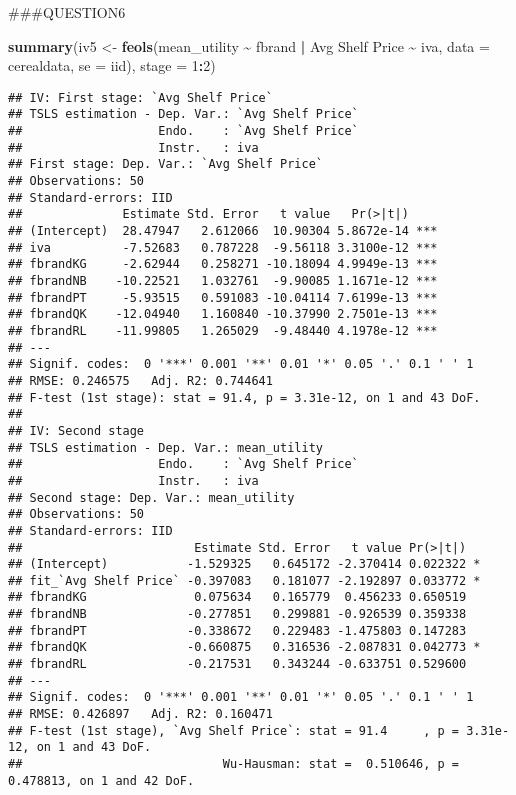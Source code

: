 \documentclass[
]{article}
\newenvironment{Shaded}{\begin{snugshade}}{\end{snugshade}}
\newcommand{\AttributeTok}[1]{\textcolor[rgb]{0.13,0.29,0.53}{#1}}
\newcommand{\DecValTok}[1]{\textcolor[rgb]{0.00,0.00,0.81}{#1}}
\newcommand{\FunctionTok}[1]{\textcolor[rgb]{0.13,0.29,0.53}{\textbf{#1}}}
\newcommand{\NormalTok}[1]{#1}
\newcommand{\OtherTok}[1]{\textcolor[rgb]{0.56,0.35,0.01}{#1}}
\newcommand{\SpecialCharTok}[1]{\textcolor[rgb]{0.81,0.36,0.00}{\textbf{#1}}}
\newcommand{\StringTok}[1]{\textcolor[rgb]{0.31,0.60,0.02}{#1}}
\begin{document}
\#\#\#QUESTION6

\begin{Shaded}
\begin{Highlighting}[]
\FunctionTok{summary}\NormalTok{(iv5 }\OtherTok{\textless{}{-}} \FunctionTok{feols}\NormalTok{(mean\_utility }\SpecialCharTok{\textasciitilde{}}\NormalTok{ fbrand }\SpecialCharTok{|} \StringTok{\textasciigrave{}}\AttributeTok{Avg Shelf Price}\StringTok{\textasciigrave{}} \SpecialCharTok{\textasciitilde{}}\NormalTok{ iva, }\AttributeTok{data =}\NormalTok{ cerealdata, }\AttributeTok{se =} \StringTok{\textquotesingle{}iid\textquotesingle{}}\NormalTok{), }\AttributeTok{stage =} \DecValTok{1}\SpecialCharTok{:}\DecValTok{2}\NormalTok{)}
\end{Highlighting}
\end{Shaded}

\begin{verbatim}
## IV: First stage: `Avg Shelf Price`
## TSLS estimation - Dep. Var.: `Avg Shelf Price`
##                   Endo.    : `Avg Shelf Price`
##                   Instr.   : iva
## First stage: Dep. Var.: `Avg Shelf Price`
## Observations: 50
## Standard-errors: IID 
##              Estimate Std. Error   t value   Pr(>|t|)    
## (Intercept)  28.47947   2.612066  10.90304 5.8672e-14 ***
## iva          -7.52683   0.787228  -9.56118 3.3100e-12 ***
## fbrandKG     -2.62944   0.258271 -10.18094 4.9949e-13 ***
## fbrandNB    -10.22521   1.032761  -9.90085 1.1671e-12 ***
## fbrandPT     -5.93515   0.591083 -10.04114 7.6199e-13 ***
## fbrandQK    -12.04940   1.160840 -10.37990 2.7501e-13 ***
## fbrandRL    -11.99805   1.265029  -9.48440 4.1978e-12 ***
## ---
## Signif. codes:  0 '***' 0.001 '**' 0.01 '*' 0.05 '.' 0.1 ' ' 1
## RMSE: 0.246575   Adj. R2: 0.744641
## F-test (1st stage): stat = 91.4, p = 3.31e-12, on 1 and 43 DoF.
## 
## IV: Second stage
## TSLS estimation - Dep. Var.: mean_utility
##                   Endo.    : `Avg Shelf Price`
##                   Instr.   : iva
## Second stage: Dep. Var.: mean_utility
## Observations: 50
## Standard-errors: IID 
##                        Estimate Std. Error   t value Pr(>|t|)    
## (Intercept)           -1.529325   0.645172 -2.370414 0.022322 *  
## fit_`Avg Shelf Price` -0.397083   0.181077 -2.192897 0.033772 *  
## fbrandKG               0.075634   0.165779  0.456233 0.650519    
## fbrandNB              -0.277851   0.299881 -0.926539 0.359338    
## fbrandPT              -0.338672   0.229483 -1.475803 0.147283    
## fbrandQK              -0.660875   0.316536 -2.087831 0.042773 *  
## fbrandRL              -0.217531   0.343244 -0.633751 0.529600    
## ---
## Signif. codes:  0 '***' 0.001 '**' 0.01 '*' 0.05 '.' 0.1 ' ' 1
## RMSE: 0.426897   Adj. R2: 0.160471
## F-test (1st stage), `Avg Shelf Price`: stat = 91.4     , p = 3.31e-12, on 1 and 43 DoF.
##                            Wu-Hausman: stat =  0.510646, p = 0.478813, on 1 and 42 DoF.
\end{verbatim}
\end{document}
